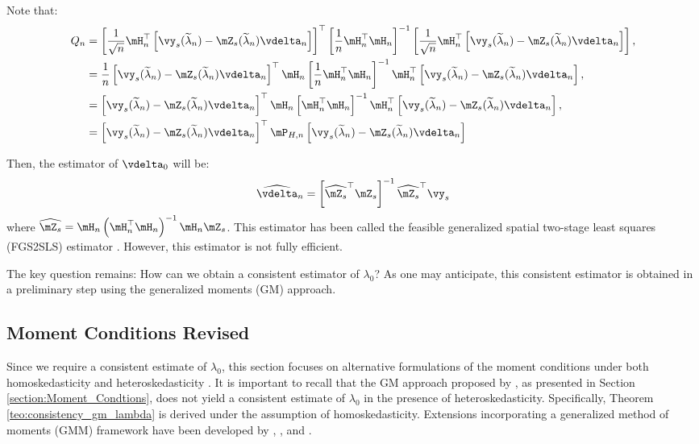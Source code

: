 Note that:
\begin{equation*}
  \begin{aligned}
 Q_n & = \left[\frac{1}{\sqrt{n}}\mH^\top_n\left[\vy_s(\widetilde{\lambda}_n) - \mZ_s(\widetilde{\lambda}_n)\vdelta_n\right]\right]^\top \left[\frac{1}{n}\mH^\top_n\mH_n\right]^{-1}\left[\frac{1}{\sqrt{n}}\mH^\top_n\left[\vy_s(\widetilde{\lambda}_n) - \mZ_s(\widetilde{\lambda}_n)\vdelta_n\right]\right], \\
     & = \frac{1}{n}\left[\vy_s(\widetilde{\lambda}_n) - \mZ_s(\widetilde{\lambda}_n)\vdelta_n\right]^\top \mH_n\left[\frac{1}{n}\mH_n^\top\mH_n\right]^{-1}\mH_n^\top \left[\vy_s(\widetilde{\lambda}_n) - \mZ_s(\widetilde{\lambda}_n)\vdelta_n\right], \\
     & = \left[\vy_s(\widetilde{\lambda}_n) - \mZ_s(\widetilde{\lambda}_n)\vdelta_n\right]^\top \mH_n\left[\mH_n^\top\mH_n\right]^{-1}\mH_n^\top \left[\vy_s(\widetilde{\lambda}_n) - \mZ_s(\widetilde{\lambda}_n)\vdelta_n\right], \\
     & = \left[\vy_s(\widetilde{\lambda}_n) - \mZ_s(\widetilde{\lambda}_n)\vdelta_n\right]^\top \mP_{H,n} \left[\vy_s(\widetilde{\lambda}_n) - \mZ_s(\widetilde{\lambda}_n)\vdelta_n\right]
\end{aligned}
\end{equation*}

Then, the estimator of $\vdelta_0$ will be:
\begin{equation*}
  \widehat{\vdelta}_n = \left[\widehat{\mZ_s}^\top\mZ_s\right]^{-1}\widehat{\mZ_s}^\top\vy_s
\end{equation*}
%
where $\widehat{\mZ_s} = \mH_n\left(\mH_n^\top\mH_n\right)^{-1}\mH_n\mZ_s$. This estimator has been called the feasible generalized spatial two-stage least squares (FGS2SLS) estimator \citep{kelejian1998generalized}. However, this estimator is not fully efficient. 

The key question remains: How can we obtain a consistent estimator of $\lambda_0$? As one may anticipate, this consistent estimator is obtained in a preliminary step using the generalized moments (GM) approach.

\subsection{Moment Conditions Revised}

Since we require a consistent estimate of $\lambda_0$, this section focuses on alternative formulations of the moment conditions under both homoskedasticity \citep{kelejian1999generalized} and heteroskedasticity \citep{kelejian2010specification}. It is important to recall that the GM approach proposed by \cite{kelejian1999generalized}, as presented in Section \ref{section:Moment_Condtions}, does not yield a consistent estimate of $\lambda_0$ in the presence of heteroskedasticity. Specifically, Theorem \ref{teo:consistency_gm_lambda} is derived under the assumption of homoskedasticity. Extensions incorporating a generalized method of moments (GMM) framework have been developed by \cite{kelejian2010specification}, \cite{arraiz2010spatial}, and \cite{drukker2013two}.

